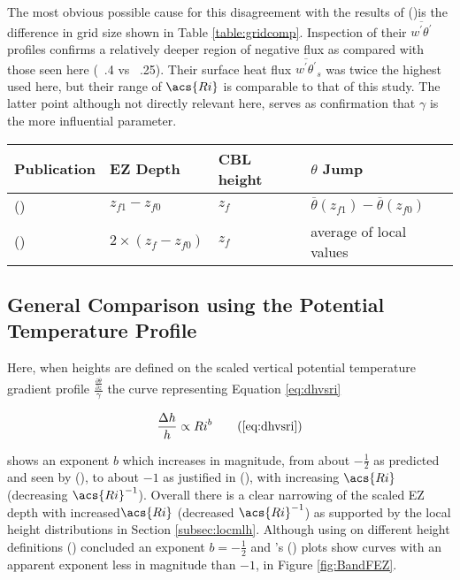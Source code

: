The most obvious possible cause for this disagreement with the results of \citeauthor{FedConzMir04} (\citeyear{FedConzMir04})is the difference in grid size shown in Table \ref{table:gridcomp}.  Inspection of their $\overline{w^{'}\theta^{'}}$ profiles confirms a relatively deeper region of negative flux as compared with those seen here (~.4 vs ~.25). Their surface heat flux $\overline{w^{'}\theta^{'}}_{s}$ was twice the highest used here, but their range of $\acs{Ri}$ is comparable to that of this study.  The latter point although not directly relevant here, serves as confirmation that $\gamma$ is the more influential parameter.\\              

\begin{table}[htbp]

\begin{center}
\begin{tabular}{ p{4cm} p{2cm} p{1.5cm} p{3cm}}
Publication & \acs{EZ} Depth & \acs{CBL} height & $\theta$ Jump\\ \hline
\citeauthor{FedConzMir04} (\citeyear{FedConzMir04}) & $z_{f1} - z_{f0}$ & $z_{f}$ &  $\overline{\theta}(z_{f1})-\overline{\theta}(z_{f0})$\\ [.3cm] %
\citeauthor{BrooksFowler2} (\citeyear{BrooksFowler2}) & $2 \times (z_{f} - z_{f0})$ & $z_{f}$ & average of local values\\ \hline

\end{tabular}
\label{table:el}
\end{center}    
\end{table}

\subsection{General Comparison using the Potential Temperature Profile}

Here, when heights are defined on the scaled vertical potential temperature gradient profile $\frac{\frac{\partial \overline{\theta}}{\partial z}}{\gamma}$ the curve representing Equation \ref{eq:dhvsri} 

\begin{equation}
\frac{\Delta h}{h} \propto Ri^{b} \tag{\ref{eq:dhvsri}}
\end{equation}

shows an exponent $b$ which increases in magnitude, from about $-\frac{1}{2}$ as predicted and seen by \citeauthor{Boers89} (\citeyear{Boers89}), to about $-1$ as justified in \citeauthor{StullNelEl} (\citeyear{StullNelEl}),  with increasing $\acs{Ri}$ (decreasing $\acs{Ri}^{-1}$).  Overall there is a clear narrowing of the scaled \acs{EZ} depth with increased$\acs{Ri}$ (decreased $\acs{Ri}^{-1}$) as supported by the local height distributions in Section \ref{subsec:locmlh}.  Although using on different height definitions \citeauthor{FedConzMir04} (\citeyear{FedConzMir04}) concluded an exponent $b = -\frac{1}{2}$ and \citeauthor{BrooksFowler2}'s (\citeyear{BrooksFowler2}) plots show curves with an apparent exponent less in magnitude than $-1$, in Figure \ref{fig:BandFEZ}. \\

